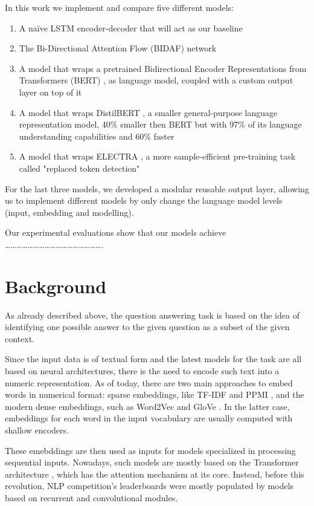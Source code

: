 \documentclass[a4paper,10pt]{report}
\begin{document}
In this work we implement and compare five different models: 
\begin{enumerate}
  \item A naïve LSTM encoder-decoder that will act as our baseline
  \item The Bi-Directional Attention Flow (BIDAF) network \cite{bidaf}
  \item A model that wraps a pretrained Bidirectional Encoder Representations from Transformers (BERT) \cite{bert}, as language model, coupled with a custom output layer on top of it
  \item A model that wraps DistilBERT \cite{distilbert}, a smaller general-purpose language representation model, 40\% smaller then BERT but with 97\% of its language understanding capabilities and 60\% faster
  \item A model that wraps ELECTRA \cite{electra}, a more sample-efficient pre-training task called "replaced token detection"
\end{enumerate}
For the last three models, we developed a modular reusable output layer, allowing us to implement different models by only change the language model levels (input, embedding and modelling).

Our experimental evaluations show that our models achieve …………………………………………….

\chapter{Background}\label{chap:background}

As already described above, the question answering task is based on the idea of identifying one possible answer to the given question as a subset of the given context. 

Since the input data is of textual form and the latest models for the task are all based on neural architectures, there is the need to encode such text into a numeric representation. As of today, there are two main approaches to embed words in numerical format: sparse embeddings, like TF-IDF \cite{tf-idf} and PPMI \cite{ppmi}, and the modern dense embeddings, such as Word2Vec \cite{word2vec} and GloVe \cite{glove}. In the latter case, embeddings for each word in the input vocabulary are usually computed with shallow encoders. 

These emebddings are then used as inputs for models specialized in processing sequential inputs. Nowadays, such models are mostly based on the Transformer architecture \cite{transformers}, which has the attention mechanism at its core. Instead, before this revolution, NLP competition's leaderboards were mostly populated by models based on recurrent and convolutional modules.
\end{document}
